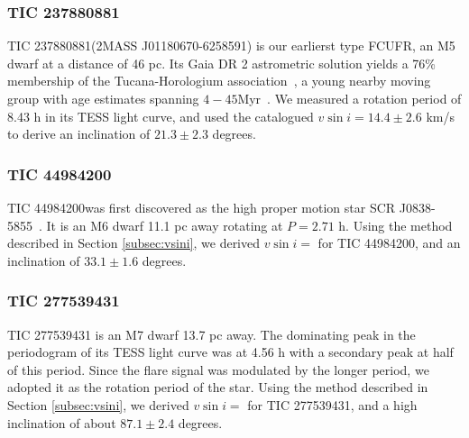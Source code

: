 \documentclass[fleqn,usenatbib,letters]{mnras}%
\newcommand{\FA}{TIC 277539431} %
\newcommand{\FB}{TIC 44984200} %
\newcommand{\FC}{TIC 237880881} %
\begin{document}
\subsubsection{\FC}
\label{sec:propsC}
\FC\;(2MASS J01180670-6258591) is our earlierst type FCUFR, an M5 dwarf at a distance of 46 pc. Its Gaia DR 2 astrometric solution yields a 76\% membership of the Tucana-Horologium association~\citep{ujjwal2020}, a young nearby moving group with age estimates spanning $4-45$\;Myr~\citep{ujjwal2020, bell2015, kraus2014}. We measured a rotation period of 8.43 h in its TESS light curve, and used the catalogued $v\sin i=14.4\pm2.6$ km/s~\citep{kraus2014} to derive an inclination of $21.3\pm2.3$ degrees. 
\subsubsection{\FB}
\label{sec:propsB}
\FB\;was first discovered as the high proper motion star SCR J0838-5855~\citep{finch2007}. It is an M6 dwarf 11.1 pc away rotating at $P=2.71$ h. Using the method described in Section \ref{subsec:vsini}, we derived $v\sin i=$ for \FB, and an inclination of $33.1\pm1.6$ degrees. 

\subsubsection{\FA}
\label{sec:propsA}
\FA\; is an M7 dwarf 13.7 pc away. The dominating peak in the periodogram of its TESS light curve was at 4.56 h with a secondary peak at half of this period. Since the flare signal was modulated by the longer period, we adopted it as the rotation period of the star. Using the method described in Section \ref{subsec:vsini}, we derived $v\sin i=$ for \FA, and a high inclination of about $87.1\pm2.4$ degrees. 
\end{document}
